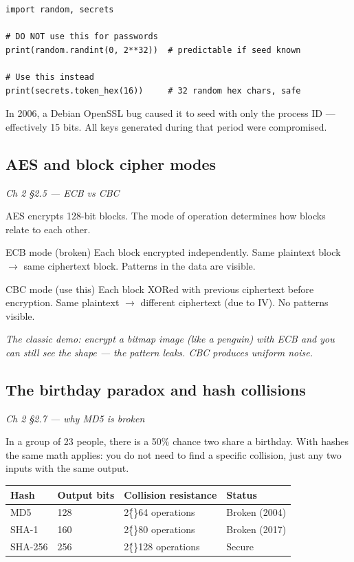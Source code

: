 \documentclass[12pt,openany]{book}
\begin{document}
\begin{lstlisting}
import random, secrets

# DO NOT use this for passwords
print(random.randint(0, 2**32))  # predictable if seed known

# Use this instead
print(secrets.token_hex(16))     # 32 random hex chars, safe\end{lstlisting}


In 2006, a Debian OpenSSL bug caused it to seed with only the process ID --- effectively 15 bits. All keys generated during that period were compromised.

\medskip

\subsection*{AES and block cipher modes}
{\small\itshape\color{gray}Ch 2 §2.5 --- ECB vs CBC}

AES encrypts 128-bit blocks. The mode of operation determines how blocks relate to each other.

ECB mode (broken)
Each block encrypted independently.
Same plaintext block $\rightarrow$ same ciphertext block.
Patterns in the data are visible.

CBC mode (use this)
Each block XORed with previous ciphertext before encryption.
Same plaintext $\rightarrow$ different ciphertext (due to IV).
No patterns visible.

{\small\itshape\color{gray}The classic demo: encrypt a bitmap image (like a penguin) with ECB and you can still see the shape --- the pattern leaks. CBC produces uniform noise.}

\medskip

\subsection*{The birthday paradox and hash collisions}
{\small\itshape\color{gray}Ch 2 §2.7 --- why MD5 is broken}

In a group of 23 people, there is a 50\% chance two share a birthday. With hashes the same math applies: you do not need to find a specific collision, just any two inputs with the same output.


\begin{center}\small\begin{tabular}{p{3.2cm}p{3.2cm}p{3.2cm}p{3.2cm}}\toprule
\textbf{Hash} & \textbf{Output bits} & \textbf{Collision resistance} & \textbf{Status} \\ \midrule
MD5 & 128 & 2\^\{\}64 operations & Broken (2004) \\
SHA-1 & 160 & 2\^\{\}80 operations & Broken (2017) \\
SHA-256 & 256 & 2\^\{\}128 operations & Secure \\
\bottomrule\end{tabular}\end{center}
\end{document}
